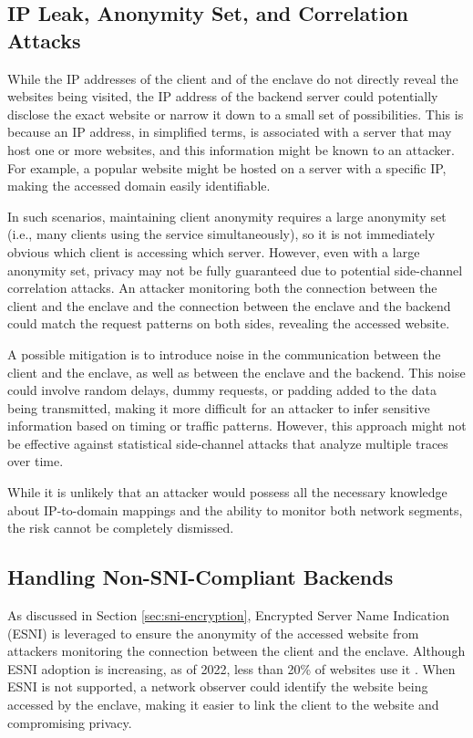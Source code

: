 \subsection{IP Leak, Anonymity Set, and Correlation Attacks} \label{sec:IP-leak}
While the IP addresses of the client and of the enclave do not directly reveal the websites being visited, the IP address of the backend server could potentially disclose the exact website or narrow it down to a small set of possibilities. This is because an IP address, in simplified terms, is associated with a server that may host one or more websites, and this information might be known to an attacker. For example, a popular website might be hosted on a server with a specific IP, making the accessed domain easily identifiable.

In such scenarios, maintaining client anonymity requires a large anonymity set (i.e., many clients using the service simultaneously), so it is not immediately obvious which client is accessing which server. However, even with a large anonymity set, privacy may not be fully guaranteed due to potential side-channel correlation attacks. An attacker monitoring both the connection between the client and the enclave and the connection between the enclave and the backend could match the request patterns on both sides, revealing the accessed website.

A possible mitigation is to introduce noise in the communication between the client and the enclave, as well as between the enclave and the backend.  This noise could involve random delays, dummy requests, or padding added to the data being transmitted, making it more difficult for an attacker to infer sensitive information based on timing or traffic patterns. However, this approach might not be effective against statistical side-channel attacks that analyze multiple traces over time.

While it is unlikely that an attacker would possess all the necessary knowledge about IP-to-domain mappings and the ability to monitor both network segments, the risk cannot be completely dismissed.

\subsection{Handling Non-SNI-Compliant Backends}
As discussed in Section \ref{sec:sni-encryption}, Encrypted Server Name Indication (ESNI) is leveraged to ensure the anonymity of the accessed website from attackers monitoring the connection between the client and the enclave. Although ESNI adoption is increasing, as of 2022, less than 20\% of websites use it \cite{SNI-adoption}. When ESNI is not supported, a network observer could identify the website being accessed by the enclave, making it easier to link the client to the website and compromising privacy.

